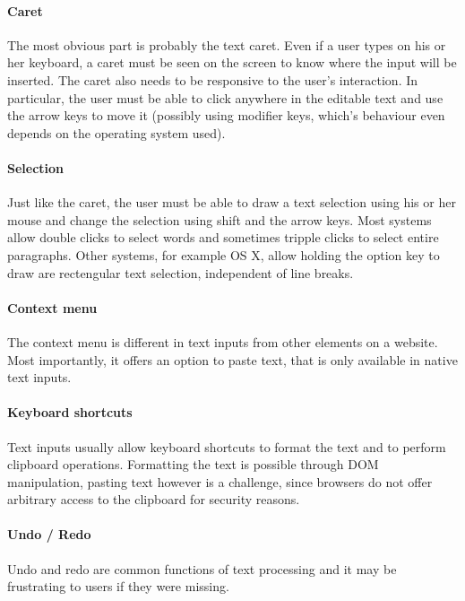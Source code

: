 \paragraph{Caret} The most obvious part is probably the text caret. Even if a user types on his or her keyboard, a caret must be seen on the screen to know where the input will be inserted. The caret also needs to be responsive to the user's interaction. In particular, the user must be able to click anywhere in the editable text and use the arrow keys to move it (possibly using modifier keys, which's behaviour even depends on the operating system used).

\paragraph{Selection} Just like the caret, the user must be able to draw a text selection using his or her mouse and change the selection using shift and the arrow keys. Most systems allow double clicks to select words and sometimes tripple clicks to select entire paragraphs. Other systems, for example OS X, allow holding the option key to draw are rectengular text selection, independent of line breaks.

\paragraph{Context menu} The context menu is different in text inputs from other elements on a website. Most importantly, it offers an option to paste text, that is only available in native text inputs.

\paragraph{Keyboard shortcuts} Text inputs usually allow keyboard shortcuts to format the text and to perform clipboard operations. Formatting the text is possible through DOM manipulation, pasting text however is a challenge, since browsers do not offer arbitrary access to the clipboard for security reasons.

\paragraph{Undo / Redo} Undo and redo are common functions of text processing and it may be frustrating to users if they were missing.

